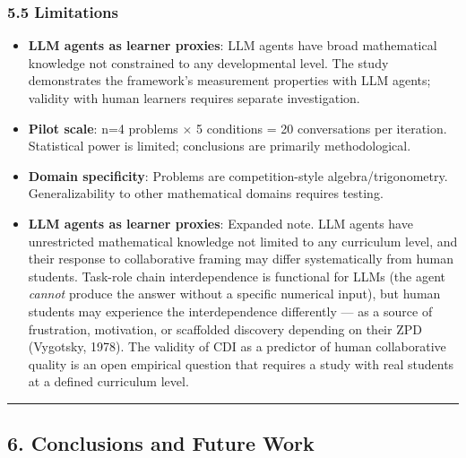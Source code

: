 \documentclass[
  11pt,
]{article}
\providecommand{\tightlist}{%
  \setlength{\itemsep}{0pt}\setlength{\parskip}{0pt}}
\begin{document}
\subsubsection{5.5 Limitations}\label{limitations}

\begin{itemize}
\tightlist
\item
  \textbf{LLM agents as learner proxies}: LLM agents have broad
  mathematical knowledge not constrained to any developmental level. The
  study demonstrates the framework's measurement properties with LLM
  agents; validity with human learners requires separate investigation.
\item
  \textbf{Pilot scale}: n=4 problems $\times$ 5 conditions = 20 conversations
  per iteration. Statistical power is limited; conclusions are primarily
  methodological.
\item
  \textbf{Domain specificity}: Problems are competition-style
  algebra/trigonometry. Generalizability to other mathematical domains
  requires testing.
\item
  \textbf{LLM agents as learner proxies}: Expanded note. LLM agents have unrestricted mathematical knowledge not limited to any curriculum level, and their response to collaborative framing may differ systematically from human students. Task-role chain interdependence is functional for LLMs (the agent \emph{cannot} produce the answer without a specific numerical input), but human students may experience the interdependence differently --- as a source of frustration, motivation, or scaffolded discovery depending on their ZPD (Vygotsky, 1978). The validity of CDI as a predictor of human collaborative quality is an open empirical question that requires a study with real students at a defined curriculum level.
\end{itemize}

\begin{center}\rule{0.5\linewidth}{0.5pt}\end{center}

\subsection{6. Conclusions and Future
Work}\label{conclusions-and-future-work}
\end{document}
